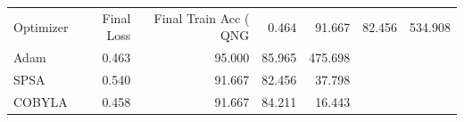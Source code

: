 \begin{tabular}{lrrrr}
\toprule
Optimizer & Final Loss & Final Train Acc (%
\midrule
QNG & 0.464 & 91.667 & 82.456 & 534.908 \\
Adam & 0.463 & 95.000 & 85.965 & 475.698 \\
SPSA & 0.540 & 91.667 & 82.456 & 37.798 \\
COBYLA & 0.458 & 91.667 & 84.211 & 16.443 \\
\bottomrule
\end{tabular}
